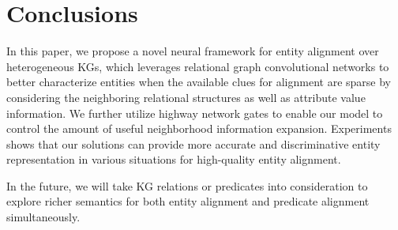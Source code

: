 
	
	\section{Conclusions}
	In this paper, we propose a novel neural framework for entity alignment over heterogeneous KGs, which leverages relational graph convolutional networks to better characterize entities when the available clues for alignment are sparse by considering the neighboring relational structures as well as attribute value information.
	We further utilize highway network gates to enable our model to control the amount of useful neighborhood information expansion. Experiments shows that our solutions can provide more accurate and discriminative entity representation in various situations for high-quality entity alignment. 
	
	In the future, we will take KG relations or predicates into consideration to explore richer
	semantics for both entity alignment and predicate alignment simultaneously.
